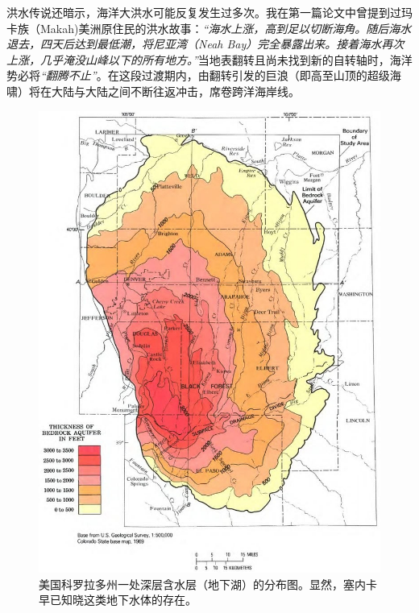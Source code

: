 \documentclass[10pt,twocolumn,letterpaper]{article}
\begin{document}
洪水传说还暗示，海洋大洪水可能反复发生过多次。我在第一篇论文中曾提到过玛卡族（Makah)美洲原住民的洪水故事：\cite{3}\textit{“海水上涨，高到足以切断海角。随后海水退去，四天后达到最低潮，将尼亚湾（Neah Bay）完全暴露出来。接着海水再次上涨，几乎淹没山峰以下的所有地方。”}当地表翻转且尚未找到新的自转轴时，海洋势必将\textit{“翻腾不止”}。在这段过渡期内，由翻转引发的巨浪（即高至山顶的超级海啸）将在大陆与大陆之间不断往返冲击，席卷跨洋海岸线。
\begin{figure}[t]
\begin{center}
   \includegraphics[width=1\linewidth]{aquifer.jpg}
\end{center}
   \caption{美国科罗拉多州一处深层含水层（地下湖）的分布图。显然，塞内卡早已知晓这类地下水体的存在。}
\label{fig:2}
\label{fig:onecol}
\end{figure}
\end{document}

